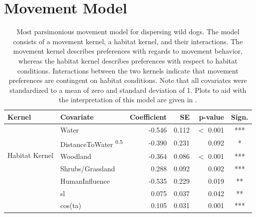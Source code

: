 \documentclass[../FinalThesis.tex]{subfiles}
\begin{document}
\newpage
\section{Movement Model}

\begin{table}[!ht]
 \begin{center}
  \caption{Most parsimonious movement model for dispersing wild dogs. The model
   consists of a movement kernel, a habitat kernel, and their interactions. The
   movement kernel describes preferences with regards to movement behavior,
   whereas the habitat kernel describes preferences with respect to habitat
   conditions. Interactions between the two kernels indicate that movement
   preferences are contingent on habitat conditions. Note that all covariates
   were standardized to a mean of zero and standard deviation of 1. Plots to aid
   with the interpretation of this model are given in
   .}
  \label{MovementModelNumbers}
   \begin{threeparttable}
    \begin{tabular}{llrrrc}
     \toprule
     Kernel & Covariate                                       & Coefficient & SE    & p-value     & Sign. \\
     \midrule
     \multirow{5}{*}{Habitat Kernel}
            & Water                                           & -0.546      & 0.112 & \(<\) 0.001 & ***   \\
            & DistanceToWater \textsuperscript{0.5}           & -0.390      & 0.231 & 0.092       & *     \\
            & Woodland                                        & -0.364      & 0.086 & \(<\) 0.001 & ***   \\
            & Shrubs/Grassland                                & 0.288       & 0.092 & 0.002       & ***   \\
            & HumanInfluence                                  & -0.535      & 0.229 & 0.019       & **    \\
     \hdashline
     \multirow{6}{*}{Movement Kernel}
            & sl                                              & 0.075       & 0.037 & 0.042       & **    \\
            & cos(ta)                                         & 0.105       & 0.031 & 0.001       & ***   \\

\end{tabular}
\end{threeparttable}
\end{center}
\end{table}
\end{document}
